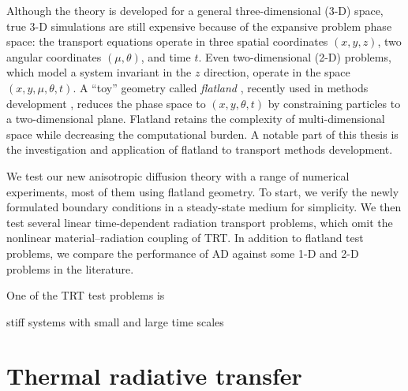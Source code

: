 Although the theory is developed for a general three-dimensional (3-D) space,
true 3-D simulations are still expensive because of the expansive problem phase
space: the transport equations operate in three spatial coordinates $(x,y,z)$,
two angular coordinates $(\mu,\theta)$, and time $t$. Even two-dimensional (2-D)
problems, which model a system invariant in the $z$ direction, operate in the
space $(x,y,\mu,\theta,t)$. A ``toy'' geometry called \emph{flatland}
\cite{Abb1884}, recently used in methods development \cite{Asa2008,Lar2009c},
reduces the phase space to $(x,y,\theta,t)$ by constraining particles to a
two-dimensional plane. Flatland retains the complexity of multi-dimensional
space while decreasing the computational burden. A notable part of this thesis
is the investigation and application of flatland to transport methods
development.

We test our new anisotropic diffusion theory with a range of numerical
experiments, most of them using flatland geometry.  To start, we verify the
newly formulated boundary conditions in a steady-state medium for simplicity. We
then test several linear time-dependent radiation transport problems, which omit
the nonlinear material--radiation coupling of TRT. In addition to flatland test
problems, we compare the performance of AD against some 1-D and 2-D problems in
the literature.

One of the TRT test problems is 


stiff systems with small and large time scales \cite{Kno2003}


\section{Thermal radiative transfer}

